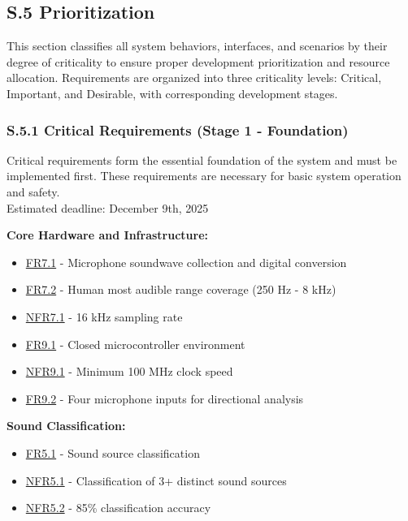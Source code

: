 \documentclass[12pt]{article}
\theoremstyle{definition}
\begin{document}
\subsection{S.5 Prioritization}

This section classifies all system behaviors, interfaces, and scenarios by their
degree of criticality to ensure proper development prioritization and resource
allocation. Requirements are organized into three criticality levels: Critical,
Important, and Desirable, with corresponding development stages.

\subsubsection{S.5.1 Critical Requirements (Stage 1 - Foundation)}

Critical requirements form the essential foundation of the system and must be
implemented first. These requirements are necessary for basic system operation
and safety. \\
\newline
Estimated deadline: December 9th, 2025 \\
\newline

\textbf{Core Hardware and Infrastructure:}
\begin{itemize}
    \item \hyperref[FR7_1]{FR7.1} - Microphone soundwave collection and digital
    conversion
    \item \hyperref[FR7_2]{FR7.2} - Human most audible range coverage
      (250 Hz - 8 kHz)
    \item \hyperref[NFR7_1]{NFR7.1} - 16 kHz sampling rate
    \item \hyperref[FR9_1]{FR9.1} - Closed microcontroller environment
    \item \hyperref[NFR9_1]{NFR9.1} - Minimum 100 MHz clock speed
    \item \hyperref[NFR9_2]{FR9.2} - Four microphone inputs for directional
    analysis
\end{itemize}

\textbf{Sound Classification:}
\begin{itemize}
    \item \hyperref[FR5_1]{FR5.1} - Sound source classification
    \item \hyperref[NFR5_1]{NFR5.1} - Classification of 3+ distinct sound
    sources
    \item \hyperref[NFR5_2]{NFR5.2} - 85\% classification accuracy
\end{itemize}
\end{document}
